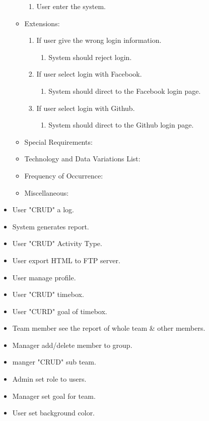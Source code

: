 \documentclass[12pt, a4paper]{article}
\begin{document}
\begin{CJK*}{UTF8}{bkai}
\begin{itemize}
\begin{itemize}
\begin{enumerate}
              \item User enter the system.
            \end{enumerate}
          \item Extensions:
            \begin{enumerate}
              \item If user give the wrong login information.
                \begin{enumerate}
                  \item System should reject login.
                \end{enumerate}
              \item If user select login with Facebook.
                \begin{enumerate}
                  \item System should direct to the Facebook login page.
                \end{enumerate}
              \item If user select login with Github.
                \begin{enumerate}
                  \item System should direct to the Github login page.
                \end{enumerate}
            \end{enumerate}
          \item Special Requirements:
          \item Technology and Data Variations List:
          \item Frequency of Occurrence:
          \item Miscellaneous:
        \end{itemize}
      \item User "CRUD" a log.
      \item System generates report.
      \item User "CRUD" Activity Type.
      \item User export HTML to FTP server.
      \item User manage profile.
      \item User "CRUD" timebox.
      \item User "CURD" goal of timebox.
      \item Team member see the report of whole team \& other members.
      \item Manager add/delete member to group.
      \item manger "CRUD" sub team.
      \item Admin set role to users.
      \item Manager set goal for team.
      \item User set background color.
    \end{itemize}


\end{CJK*}
\end{document}
